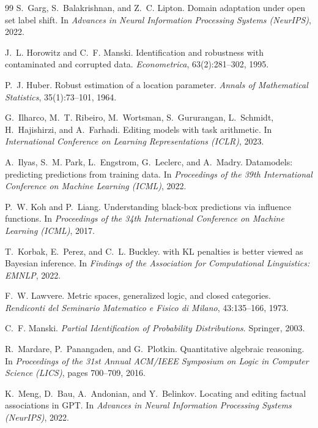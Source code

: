 \documentclass[11pt]{article}
\theoremstyle{definition}
\theoremstyle{remark}
\begin{document}
\begin{thebibliography}{99}
S.~Garg, S.~Balakrishnan, and Z.~C. Lipton.
\newblock Domain adaptation under open set label shift.
\newblock In \emph{Advances in Neural Information Processing Systems (NeurIPS)}, 2022.

J.~L. Horowitz and C.~F. Manski.
\newblock Identification and robustness with contaminated and corrupted data.
\newblock \emph{Econometrica}, 63(2):281--302, 1995.

P.~J. Huber.
\newblock Robust estimation of a location parameter.
\newblock \emph{Annals of Mathematical Statistics}, 35(1):73--101, 1964.

G.~Ilharco, M.~T. Ribeiro, M.~Wortsman, S.~Gururangan, L.~Schmidt, H.~Hajishirzi, and A.~Farhadi.
\newblock Editing models with task arithmetic.
\newblock In \emph{International Conference on Learning Representations (ICLR)}, 2023.

A.~Ilyas, S.~M. Park, L.~Engstrom, G.~Leclerc, and A.~Madry.
\newblock Datamodels: predicting predictions from training data.
\newblock In \emph{Proceedings of the 39th International Conference on Machine Learning (ICML)}, 2022.

P.~W. Koh and P.~Liang.
\newblock Understanding black-box predictions via influence functions.
\newblock In \emph{Proceedings of the 34th International Conference on Machine Learning (ICML)}, 2017.

T.~Korbak, E.~Perez, and C.~L. Buckley.
 with {KL} penalties is better viewed as {B}ayesian inference.
\newblock In \emph{Findings of the Association for Computational Linguistics: EMNLP}, 2022.

F.~W. Lawvere.
\newblock Metric spaces, generalized logic, and closed categories.
\newblock \emph{Rendiconti del Seminario Matematico e Fisico di Milano}, 43:135--166, 1973.

C.~F. Manski.
\newblock \emph{Partial Identification of Probability Distributions}.
\newblock Springer, 2003.

R.~Mardare, P.~Panangaden, and G.~Plotkin.
\newblock Quantitative algebraic reasoning.
\newblock In \emph{Proceedings of the 31st Annual ACM/IEEE Symposium on Logic in Computer Science
  (LICS)}, pages 700--709, 2016.

K.~Meng, D.~Bau, A.~Andonian, and Y.~Belinkov.
\newblock Locating and editing factual associations in {GPT}.
\newblock In \emph{Advances in Neural Information Processing Systems (NeurIPS)}, 2022.


\end{thebibliography}
\end{document}

